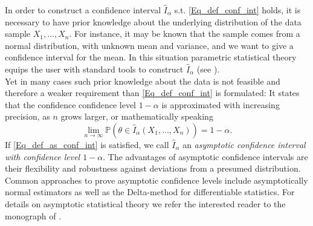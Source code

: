 \documentclass[conference]{IEEEtran}
\begin{document}
In order to construct a confidence interval $\hat I_\alpha$ s.t. \eqref{Eq_def_conf_int} holds, it is necessary to have prior knowledge about the underlying distribution of the data sample $X_1,..., X_n$. For instance, it may be known that the sample comes from a normal distribution, with unknown mean and variance, and we want to give a confidence interval for the mean. In this situation parametric statistical theory equips the user with standard tools to construct $\hat I_\alpha$ (see \cite{bickel2015}).\\ Yet in many cases such prior knowledge about the data is not feasible and therefore a weaker requirement than \eqref{Eq_def_conf_int} is formulated: It states that the confidence confidence level $1-\alpha$ is approximated with increasing precision, as $n$ grows larger, or mathematically speaking 
\begin{equation} \label{Eq_def_as_conf_int}
\lim_{n \to \infty}\mathbb{P}(\theta   \in \hat I_\alpha(X_1,...,X_n)) = 1-\alpha.
\end{equation}
If \eqref{Eq_def_as_conf_int} is satisfied, we call $\hat I_\alpha$ an \textit{asymptotic confidence interval with confidence level $1-\alpha$}. The advantages of asymptotic confidence intervals are their flexibility and robustness against deviations from a presumed distribution. Common approaches to prove asymptotic confidence levels include asymptotically normal estimators as well as the Delta-method for differentiable statistics. For details on asymptotic statistical theory we refer the interested reader to the monograph of \cite{vandervaart1996}.
\end{document}
